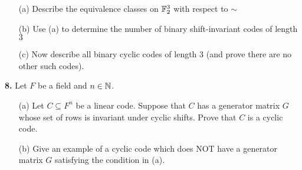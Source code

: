 \documentclass[12pt]{amsart}
\begin{document}
\begin{itemize}
\item[(a)] Describe the equivalence classes on ${\mathbb F}_2^3$ with respect to $\sim$
\item[(b)] Use (a) to determine the number of binary shift-invariant codes of length $3$
\item[(c)] Now describe all binary cyclic codes of length $3$ (and prove there are no other such codes).
\end{itemize}
\skv
{\bf 8.} Let $F$ be a field and $n\in{\mathbb N}$.
\begin{itemize}
\item[(a)] Let $C\subseteq F^n$ be a linear code. Suppose that $C$ has a generator matrix $G$ whose set of rows is invariant under cyclic shifts. Prove that $C$ is a cyclic code.
  
\item[(b)] Give an example of a cyclic code which does NOT have a generator matrix $G$ satisfying the condition in (a).
\end{itemize}
\end{document}
